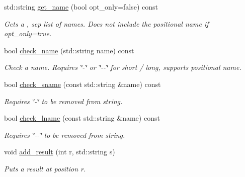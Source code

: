 \begin{DoxyCompactItemize}
\mbox{\label{class_c_l_i_1_1_option_a21524238e17fd0367f4a3528665e7816}} 
std\+::string \hyperlink{class_c_l_i_1_1_option_a21524238e17fd0367f4a3528665e7816}{get\+\_\+name} (bool opt\+\_\+only=false) const
\begin{DoxyCompactList}\small\item\em Gets a , sep list of names. Does not include the positional name if opt\+\_\+only=true. \end{DoxyCompactList}\item 
\mbox{\label{class_c_l_i_1_1_option_af457a9a493f06f212cad9f854b281200}} 
bool \hyperlink{class_c_l_i_1_1_option_af457a9a493f06f212cad9f854b281200}{check\+\_\+name} (std\+::string name) const
\begin{DoxyCompactList}\small\item\em Check a name. Requires \char`\"{}-\/\char`\"{} or \char`\"{}-\/-\/\char`\"{} for short / long, supports positional name. \end{DoxyCompactList}\item 
\mbox{\label{class_c_l_i_1_1_option_adc89601cb96badc8299eebac5f158160}} 
bool \hyperlink{class_c_l_i_1_1_option_adc89601cb96badc8299eebac5f158160}{check\+\_\+sname} (const std\+::string \&name) const
\begin{DoxyCompactList}\small\item\em Requires \char`\"{}-\/\char`\"{} to be removed from string. \end{DoxyCompactList}\item 
\mbox{\label{class_c_l_i_1_1_option_aab0fc59aaa0e04b9bfe1495702ba679e}} 
bool \hyperlink{class_c_l_i_1_1_option_aab0fc59aaa0e04b9bfe1495702ba679e}{check\+\_\+lname} (const std\+::string \&name) const
\begin{DoxyCompactList}\small\item\em Requires \char`\"{}-\/-\/\char`\"{} to be removed from string. \end{DoxyCompactList}\item 
\mbox{\label{class_c_l_i_1_1_option_a8f6617a899c47c04eb63521116668c9b}} 
void \hyperlink{class_c_l_i_1_1_option_a8f6617a899c47c04eb63521116668c9b}{add\+\_\+result} (int r, std\+::string s)
\begin{DoxyCompactList}\small\item\em Puts a result at position r. \end{DoxyCompactList}\item 

\end{DoxyCompactItemize}
